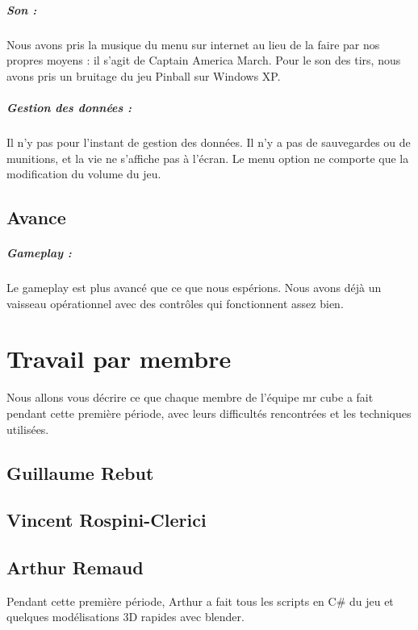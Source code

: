 \documentclass[10pt, titlepage]{report}
\begin{document}
\paragraph{Son :}
Nous avons pris la musique du menu sur internet au lieu de la faire par nos propres moyens : il s'agit de Captain America March. Pour le son des tirs, nous avons pris un bruitage du jeu Pinball sur Windows XP.

\paragraph{Gestion des données :}
Il n'y pas pour l'instant de gestion des données. Il n'y a pas de sauvegardes ou de munitions, et la vie ne s'affiche pas à l'écran. Le menu option ne comporte que la modification du volume du jeu.

\section{Avance}

\paragraph{Gameplay :}
Le gameplay est plus avancé que ce que nous espérions. Nous avons déjà un vaisseau opérationnel avec des contrôles qui fonctionnent assez bien.

\chapter{Travail par membre}
Nous allons vous décrire ce que chaque membre de l'équipe mr cube a fait pendant cette première période, avec leurs difficultés rencontrées et les techniques utilisées.

\section{Guillaume Rebut}

\section{Vincent Rospini-Clerici}

\section{Arthur Remaud}
Pendant cette première période, Arthur a fait tous les scripts en C\# du jeu et quelques modélisations 3D rapides avec blender.
\end{document}
